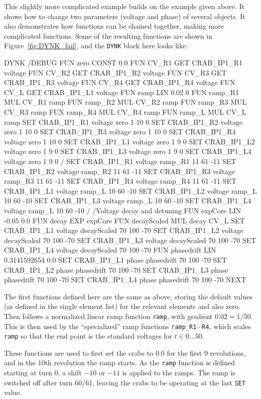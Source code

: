 This slightly more complicated example builds on the example given above.
It shows how to change two parameters (voltage and phase) of several objects.
It also demonstrates how functions can be chained together, making more complicated functions.
Some of the resulting functions are shown in Figure~\ref{fig:DYNK_fail}, and the \texttt{DYNK} block here looks like:
\begin{cverbatim}
DYNK
/DEBUG
FUN zero CONST 0.0
FUN CV_R1 GET CRAB_IP1_R1 voltage
FUN CV_R2 GET CRAB_IP1_R2 voltage
FUN CV_R3 GET CRAB_IP1_R3 voltage
FUN CV_R4 GET CRAB_IP1_R4 voltage
FUN CV_L  GET CRAB_IP1_L1 voltage
FUN ramp LIN 0.02 0
FUN ramp_R1 MUL CV_R1 ramp
FUN ramp_R2 MUL CV_R2 ramp
FUN ramp_R3 MUL CV_R3 ramp
FUN ramp_R4 MUL CV_R4 ramp
FUN ramp_L  MUL CV_L  ramp
SET CRAB_IP1_R1 voltage zero 1 10 0
SET CRAB_IP1_R2 voltage zero 1 10 0
SET CRAB_IP1_R3 voltage zero 1 10 0
SET CRAB_IP1_R4 voltage zero 1 10 0
SET CRAB_IP1_L1 voltage zero 1 9 0
SET CRAB_IP1_L2 voltage zero 1 9 0
SET CRAB_IP1_L3 voltage zero 1 9 0
SET CRAB_IP1_L4 voltage zero 1 9 0
/
SET CRAB_IP1_R1 voltage ramp_R1 11 61 -11
SET CRAB_IP1_R2 voltage ramp_R2 11 61 -11
SET CRAB_IP1_R3 voltage ramp_R3 11 61 -11
SET CRAB_IP1_R4 voltage ramp_R4 11 61 -11
SET CRAB_IP1_L1 voltage ramp_L 10 60 -10
SET CRAB_IP1_L2 voltage ramp_L 10 60 -10
SET CRAB_IP1_L3 voltage ramp_L 10 60 -10
SET CRAB_IP1_L4 voltage ramp_L 10 60 -10
/
/Voltage decay and detuning
FUN expCore LIN -0.05 0.0
FUN decay EXP expCore
FUN decayScaled MUL decay CV_L
SET CRAB_IP1_L1 voltage decayScaled 70 100 -70
SET CRAB_IP1_L2 voltage decayScaled 70 100 -70
SET CRAB_IP1_L3 voltage decayScaled 70 100 -70
SET CRAB_IP1_L4 voltage decayScaled 70 100 -70
FUN phasedrift LIN 0.3141592654 0.0
SET CRAB_IP1_L1 phase phasedrift 70 100 -70
SET CRAB_IP1_L2 phase phasedrift 70 100 -70
SET CRAB_IP1_L3 phase phasedrift 70 100 -70
SET CRAB_IP1_L4 phase phasedrift 70 100 -70
NEXT
\end{cverbatim}
The first functions defined here are the same as above, storing the default values (as defined in the single element list) for the relevant elements and also zero.
Then follows a normalized linear ramp function \texttt{ramp}, with gradient $0.02 = 1/50$.
This is then used by the ``specialized'' ramp functions \texttt{ramp\_R1$\cdots$R4}, which scales \texttt{ramp} so that the end point is the standard voltages for $t\in 0\ldots50$.

These functions are used to first set the crabs to $0.0$ for the first $9$ revolutions, and in the 10th revolution the ramp starts.
As the \texttt{ramp} function is defined starting at turn $0$, a shift $-10$ or $-11$ is applied to the ramps.
The ramp is switched off after turn 60/61, leaving the crabs to be operating at the last \texttt{SET} value.

